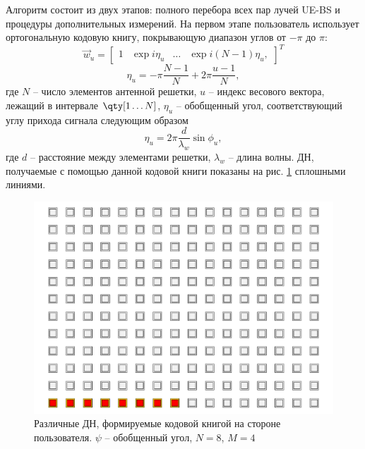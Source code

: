 Алгоритм состоит из двух этапов: полного перебора всех пар лучей UE-BS и
процедуры дополнительных измерений.
На первом этапе пользователь использует ортогональную кодовую книгу, покрывающую
диапазон углов от $-\pi$ до $\pi$:
\begin{equation}
    \vec w_u =
    \begin{bmatrix}
        1 & \exp {i \eta_u} & \dots & \exp{i(N-1)\eta_u},
    \end{bmatrix}^T
\end{equation}
\begin{equation}
    \eta_u = -\pi \frac{N-1}{N} + 2\pi \frac{u-1}{N},
\end{equation}
где $N$ -- число элементов антенной решетки, $u$ -- индекс весового вектора, лежащий в интервале $\qty[1 \dots N]$, $\eta_u$ -- обобщенный угол, соответствующий углу прихода сигнала следующим образом
\begin{equation}
    \eta_u = 2\pi \frac{d}{\lambda_w}\sin\phi_u,
\end{equation}
где $d$ -- расстояние между элементами решетки, $\lambda_w$ -- длина волны. ДН,
получаемые с помощью данной кодовой книги показаны на рис. \ref{fig:4.9}
сплошными линиями.
\begin{figure}[ht]
    \centering
    \includegraphics[width=0.5\linewidth]{figs/fig4.8}
    \caption{Различные ДН, формируемые кодовой книгой на стороне пользователя. $\psi$ -- обобщенный угол, $N=8$, $M=4$}
    \label{fig:4.9}
\end{figure}

